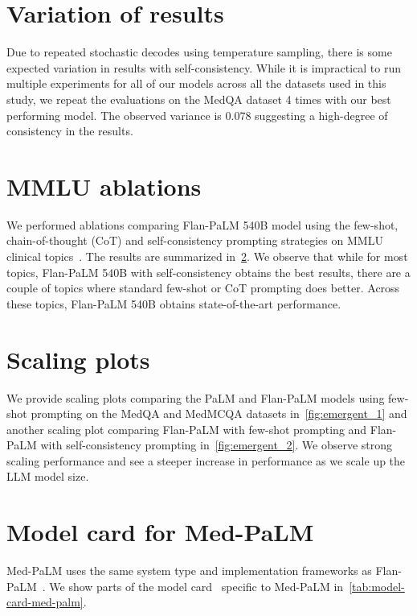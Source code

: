 \section{Variation of results}
\label{appendix:result-variation}

Due to repeated stochastic decodes using temperature sampling, there is some expected variation in results with self-consistency. While it is impractical to run multiple experiments for all of our models across all the datasets used in this study, we repeat the evaluations on the MedQA dataset 4 times with our best performing model. The observed variance is 0.078 suggesting a high-degree of consistency in the results.

\section{MMLU ablations}
\label{appendix:mmlu-ablations}

We performed ablations comparing Flan-PaLM 540B model using the few-shot, chain-of-thought (CoT) and self-consistency prompting strategies on MMLU clinical topics~\cite{hendrycks2020measuring}. The results are summarized in~\ref{appendix:mmlu-ablations}. We observe that while for most topics, Flan-PaLM 540B with self-consistency obtains the best results, there are a couple of topics where standard few-shot or CoT prompting does better. Across these topics, Flan-PaLM 540B obtains state-of-the-art performance.

\section{Scaling plots}
\label{appendix:scaling-plots}
We provide scaling plots comparing the PaLM and Flan-PaLM models using few-shot prompting on the MedQA and MedMCQA datasets in~\ref{fig:emergent_1} and another scaling plot comparing Flan-PaLM with few-shot prompting and Flan-PaLM with self-consistency prompting in~\ref{fig:emergent_2}. We observe strong scaling performance and see a steeper increase in performance as we scale up the LLM model size.

\section{Model card for Med-PaLM}
\label{appendix:medpalm-model-card}
Med-PaLM uses the same system type and implementation frameworks as Flan-PaLM~\cite{chung2022scaling}. We show parts of the model card~\cite{mitchell2019model} specific to Med-PaLM in~\ref{tab:model-card-med-palm}.

